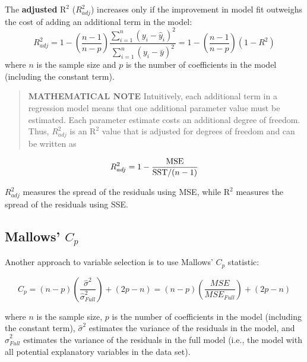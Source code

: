\documentclass[
]{book}
\begin{document}
The \textbf{adjusted} \(\mathrm{R}^2\) (\(R^2_{adj}\)) increases only if the improvement in model fit outweighs the cost of adding an additional term in the model:
\begin{equation}
R^2_{adj} = 1 - \left(\frac{n - 1}{n - p}\right)\frac{\sum_{i=1}^n (y_i - \hat{y}_i)^2}{\sum_{i=1}^n (y_i - \bar{y})^2}
= 1 - \left(\frac{n - 1}{n - p}\right)(1 - R^2)
\tag{3.13}
\end{equation}
where \(n\) is the sample size and \(p\) is the number of coefficients in the model (including the constant term).

\begin{quote}
\textbf{MATHEMATICAL NOTE} Intuitively, each additional term in a regression model means that one additional parameter value must be estimated. Each parameter estimate costs an additional degree of freedom. Thus, \(R^2_{adj}\) is an \(\mathrm{R}^2\) value that is adjusted for degrees of freedom and can be written as
\end{quote}

\begin{equation}
R^2_{adj} = 1 - \frac{\text{MSE}}{\text{SST}/(n - 1)} 
\notag
\end{equation}

\(R^2_{adj}\) measures the spread of the residuals using MSE, while \(\mathrm{R}^2\) measures the spread of the residuals using SSE.

\hypertarget{mallows-c_p}{%
\subsection*{\texorpdfstring{Mallows' \(C_p\)}{Mallows' C\_p}}\label{mallows-c_p}}

Another approach to variable selection is to use Mallows' \(C_p\) statistic:

\begin{equation}
C_p = (n - p)\left(\frac{\hat{\sigma}^2}{\hat{\sigma}^2_{Full}}\right) + (2p - n)
= (n - p)\left(\frac{MSE}{MSE_{Full}}\right) + (2p - n)
\tag{3.14}
\end{equation}

where \(n\) is the sample size, \(p\) is the number of coefficients in the model (including the constant term), \(\hat{\sigma}^2\) estimates the variance of the residuals in the model, and \(\hat{\sigma}^2_{Full}\) estimates the variance of the residuals in the full model (i.e., the model with all potential explanatory variables in the data set).
\end{document}
